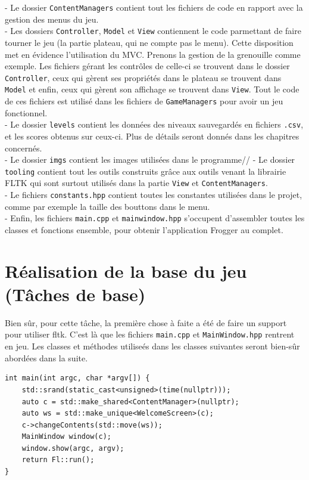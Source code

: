 \documentclass[a4paper, 12pt]{article}
\begin{document}
- Le dossier \texttt{ContentManagers} contient tout les fichiers de code en rapport avec la gestion des menus du jeu.\\
- Les dossiers \texttt{Controller}, \texttt{Model} et \texttt{View} contiennent le code parmettant de faire tourner le jeu (la partie plateau, qui ne compte pas le menu).
Cette disposition met en évidence l'utilisation du MVC. Prenons la gestion de la grenouille comme exemple. 
Les fichiers gérant les contrôles de celle-ci se trouvent dans le dossier \texttt{Controller}, ceux qui gèrent ses propriétés dans le plateau se trouvent dans \texttt{Model} et enfin, ceux qui gèrent son affichage se trouvent dans \texttt{View}. Tout le code de ces fichiers est utilisé dans les fichiers de \texttt{GameManagers} pour avoir un jeu fonctionnel.\\
- Le dossier \texttt{levels} contient les données des niveaux sauvegardés en fichiers \texttt{.csv}, et les scores obtenus sur ceux-ci. Plus de détails seront donnés dans les chapitres concernés. \\
- Le dossier  \texttt{imgs} contient les images utilisées dans le programme//
- Le dossier \texttt{tooling} contient tout les outils construits grâce aux outils venant la librairie FLTK qui sont surtout utilisés dans la partie \texttt{View} et \texttt{ContentManagers}. \\
- Le fichiers \texttt{constants.hpp} contient toutes les constantes utilisées dans le projet, comme par exemple la taille des bouttons dans le menu. \\
- Enfin, les fichiers \texttt{main.cpp} et \texttt{mainwindow.hpp} s'occupent d'assembler toutes les classes et fonctions ensemble, pour obtenir l'application Frogger au complet. 

\section{Réalisation de la base du jeu (Tâches de base)}
Bien sûr, pour cette tâche, la première chose à faite a été de faire un support pour utiliser fltk. 
C'est là que les fichiers \texttt{main.cpp} et \texttt{MainWindow.hpp} rentrent en jeu. 
Les classes et méthodes utiliseés dans les classes suivantes seront bien-sûr abordées dans la suite. 

\begin{lstlisting}
int main(int argc, char *argv[]) {
    std::srand(static_cast<unsigned>(time(nullptr)));
    auto c = std::make_shared<ContentManager>(nullptr);
    auto ws = std::make_unique<WelcomeScreen>(c);
    c->changeContents(std::move(ws));
    MainWindow window(c);
    window.show(argc, argv);
    return Fl::run();
}
\end{lstlisting}
\end{document}
